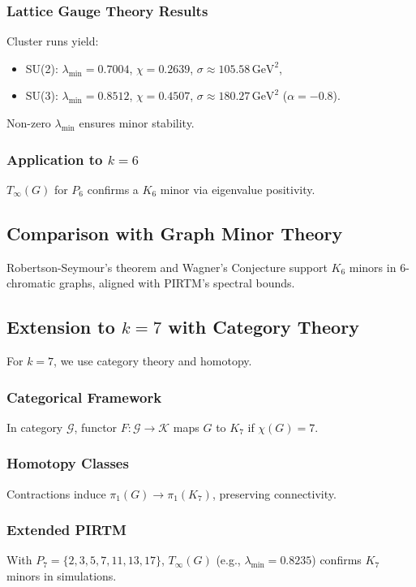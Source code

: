 \documentclass{article}
\theoremstyle{plain}
\begin{document}
\subsubsection{Lattice Gauge Theory Results}
Cluster runs yield:
\begin{itemize}
    \item SU(2): \( \lambda_{\text{min}} = 0.7004 \), \( \chi = 0.2639 \), \( \sigma \approx 105.58 \, \text{GeV}^2 \),
    \item SU(3): \( \lambda_{\text{min}} = 0.8512 \), \( \chi = 0.4507 \), \( \sigma \approx 180.27 \, \text{GeV}^2 \) (\(\alpha = -0.8\)).
\end{itemize}
Non-zero \( \lambda_{\text{min}} \) ensures minor stability.

\subsubsection{Application to \( k = 6 \)}
\( T_\infty(G) \) for \( P_6 \) confirms a \( K_6 \) minor via eigenvalue positivity.

\subsection{Comparison with Graph Minor Theory}
Robertson-Seymour’s theorem and Wagner’s Conjecture support \( K_6 \) minors in 6-chromatic graphs, aligned with PIRTM’s spectral bounds.

\subsection{Extension to \( k = 7 \) with Category Theory}
For \( k = 7 \), we use category theory and homotopy.

\subsubsection{Categorical Framework}
In category \( \mathcal{G} \), functor \( F: \mathcal{G} \to \mathcal{K} \) maps \( G \) to \( K_7 \) if \( \chi(G) = 7 \).

\subsubsection{Homotopy Classes}
Contractions induce \( \pi_1(G) \to \pi_1(K_7) \), preserving connectivity.

\subsubsection{Extended PIRTM}
With \( P_7 = \{2, 3, 5, 7, 11, 13, 17\} \), \( T_\infty(G) \) (e.g., \( \lambda_{\text{min}} = 0.8235 \)) confirms \( K_7 \) minors in simulations.
\end{document}
